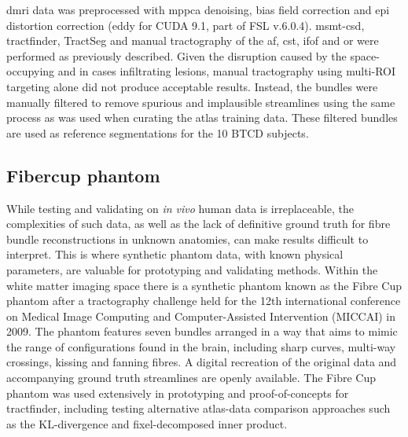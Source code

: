 \gls{dmri} data was preprocessed with \gls{mppca} denoising, bias field correction and \gls{epi} distortion correction (eddy for CUDA 9.1, part of FSL v.6.0.4).
\gls{msmt}-\gls{csd}, tractfinder, TractSeg and manual tractography of the \gls{af}, \gls{cst}, \gls{ifof} and \gls{or} were performed as previously described.
Given the disruption caused by the space-occupying and in cases infiltrating lesions, manual tractography using multi-ROI targeting alone did not produce acceptable results.
Instead, the bundles were manually filtered to remove spurious and implausible streamlines using the same process as was used when curating the atlas training data.
These filtered bundles are used as reference segmentations for the 10 BTCD subjects.

\subsection{Fibercup phantom}

While testing and validating on \textit{in vivo} human data is irreplaceable, the complexities of such data, as well as the lack of definitive ground truth for fibre bundle reconstructions in unknown anatomies, can make results difficult to interpret.
This is where synthetic phantom data, with known physical parameters, are valuable for prototyping and validating methods.
Within the white matter imaging space there is a synthetic phantom known as the Fibre Cup phantom after a tractography challenge held for the 12th international conference on Medical Image Computing and Computer-Assisted Intervention (MICCAI) in 2009.\autocite{Fillard2011}
The phantom features seven bundles arranged in a way that aims to mimic the range of configurations found in the brain, including sharp curves, multi-way crossings, kissing and fanning fibres.
A digital recreation of the original data and accompanying ground truth streamlines are openly available.\autocite{NITRC}
The Fibre Cup phantom was used extensively in prototyping and proof-of-concepts for tractfinder, including testing alternative atlas-data comparison approaches such as the KL-divergence and fixel-decomposed inner product.
